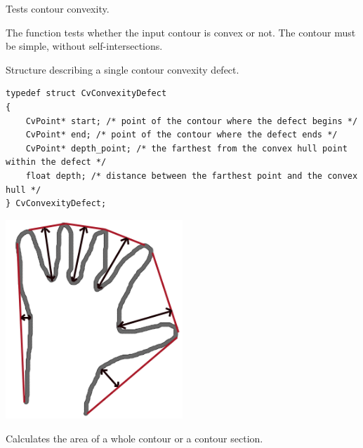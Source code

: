 Tests contour convexity.


\begin{description}
\end{description}

The function tests whether the input contour is convex or not. The contour must be simple, without self-intersections.

\label{CvConvexityDefect}

Structure describing a single contour convexity defect.

\begin{lstlisting}
typedef struct CvConvexityDefect
{
    CvPoint* start; /* point of the contour where the defect begins */
    CvPoint* end; /* point of the contour where the defect ends */
    CvPoint* depth_point; /* the farthest from the convex hull point within the defect */
    float depth; /* distance between the farthest point and the convex hull */
} CvConvexityDefect;
\end{lstlisting}

\includegraphics[width=0.5\textwidth]{pics/defects.png}

Calculates the area of a whole contour or a contour section.


